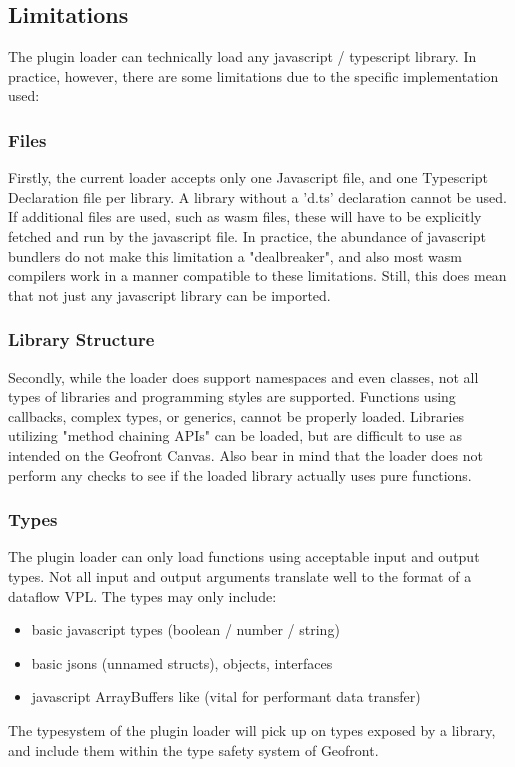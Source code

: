 \subsection{Limitations}
\label{sec:implementation:loading:limits}

The plugin loader can technically load any javascript / typescript library. 
In practice, however, there are some limitations due to the specific implementation used:

\subsubsection*{Files}
Firstly, the current loader accepts only one Javascript file, and one Typescript Declaration file per library.
A library without a 'd.ts' declaration cannot be used. 
If additional files are used, such as \ac{wasm} files, these will have to be explicitly fetched and run by the javascript file. 
In practice, the abundance of javascript bundlers do not make this limitation a "dealbreaker", and also most \ac{wasm} compilers work in a manner compatible to these limitations.
Still, this does mean that not just any javascript library can be imported. 

\subsubsection*{Library Structure}
Secondly, while the loader does support namespaces and even classes, not all types of libraries and programming styles are supported. 
Functions using callbacks, complex types, or generics, cannot be properly loaded. 
Libraries utilizing "method chaining APIs" can be loaded, but are difficult to use as intended on the Geofront Canvas.
Also bear in mind that the loader does not perform any checks to see if the loaded library actually uses pure functions. 

\subsubsection*{Types}
The plugin loader can only load functions using acceptable input and output types. 
Not all input and output arguments translate well to the format of a dataflow VPL. 
The types may only include: 
\begin{itemize}
  \item basic javascript types (boolean / number / string)
  \item basic jsons (unnamed structs), objects, interfaces 
  \item javascript ArrayBuffers like  (vital for performant data transfer)
\end{itemize}
The typesystem of the plugin loader will pick up on types exposed by a library, and include them within the type safety system of Geofront. 

